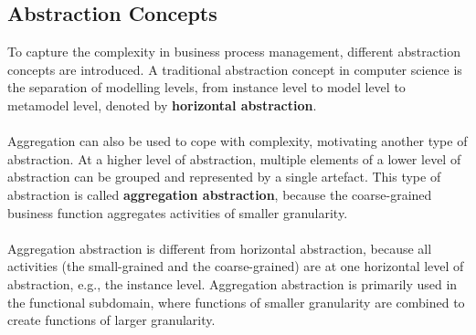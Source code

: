 \documentclass[10pt,a4paper]{article}
\begin{document}
\subsection{Abstraction Concepts}
To capture the complexity in business process management, different abstraction concepts are introduced. A traditional abstraction concept in computer science is the separation of modelling levels, from instance level to model level to metamodel level, denoted by \textbf{horizontal abstraction}.  \\ \\
Aggregation can also be used to cope with complexity, motivating another type of abstraction. At a higher level of abstraction, multiple elements of a lower level of abstraction can be grouped and represented by a single artefact. This type of abstraction is called \textbf{aggregation abstraction}, because the coarse-grained business function aggregates activities of smaller granularity.
\\ \\
Aggregation abstraction is different from horizontal abstraction, because all activities (the small-grained and the coarse-grained) are at one horizontal level of abstraction, e.g., the instance level. Aggregation abstraction is primarily used in the functional subdomain, where functions of smaller granularity are combined to create functions of larger granularity.
\pagebreak
\end{document}
